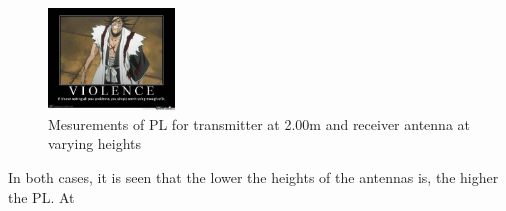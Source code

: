 \begin{figure}
\centering
\includegraphics[width=0.3\textwidth]{figures/bleach-3712665.jpg}
\caption{Mesurements of PL for transmitter at 2.00m and receiver antenna at varying heights}
\label{Meas3}
\end{figure}

In both cases, it is seen that the lower the heights of the antennas is, the higher the PL. At 